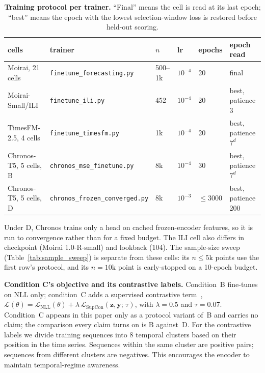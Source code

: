 \begin{table}[!htbp]
\centering
\caption{\textbf{Training protocol per trainer.}  ``Final'' means the cell is read
at its last epoch; ``best'' means the epoch with the lowest selection-window loss
is restored before held-out scoring.}
\label{tab:trainers}
\small
\begin{tabular}{@{}llllll@{}}
\toprule
cells & trainer & $n$ & lr & epochs & epoch read \\
\midrule
Moirai, 21 cells & \texttt{finetune\_forecasting.py} & 500--1k & $10^{-4}$ & 20 & final \\
Moirai-Small/ILI & \texttt{finetune\_ili.py} & 452 & $10^{-4}$ & 20 & best, patience 3 \\
TimesFM-2.5, 4 cells & \texttt{finetune\_timesfm.py} & 1k & $10^{-4}$ & 20 & best, patience $7^{d}$ \\
Chronos-T5, 5 cells, B & \texttt{chronos\_mse\_finetune.py} & 8k & $10^{-4}$ & 30 & best, patience $7^{d}$ \\
Chronos-T5, 5 cells, D & \texttt{chronos\_frozen\_converged.py} & 8k & $10^{-3}$ & ${\leq}3000$ & best, patience 200 \\
\bottomrule
\end{tabular}
\end{table}

Under D, Chronos trains only a head on cached frozen-encoder features, so it is
run to convergence rather than for a fixed budget.  The ILI cell also differs in
checkpoint (Moirai 1.0-R-small) and lookback (104).  The sample-size sweep
(Table~\ref{tab:sample_sweep}) is separate from these cells: its
$n{\leq}5\text{k}$ points use the first row's protocol, and its $n{=}10\text{k}$
point is early-stopped on a 10-epoch budget.

\textbf{Condition C's objective and its contrastive labels.}
Condition~B fine-tunes on NLL only; condition~C adds a supervised contrastive
term~\citep{khosla2020supcon},
$\mathcal{L}(\theta) = \mathcal{L}_{\text{NLL}}(\theta) +
\lambda\,\mathcal{L}_{\text{SupCon}}(\mathbf{z}, \mathbf{y};\, \tau)$, with
$\lambda = 0.5$ and $\tau = 0.07$.  Condition~C appears in this paper only as a
protocol variant of~B and carries no claim; the comparison every claim turns on
is B against~D.
For the contrastive labels we divide training sequences into
8 temporal clusters based on their position in the time series.
Sequences within the same cluster are positive pairs; sequences from
different clusters are negatives.
This encourages the encoder to maintain temporal-regime awareness.

